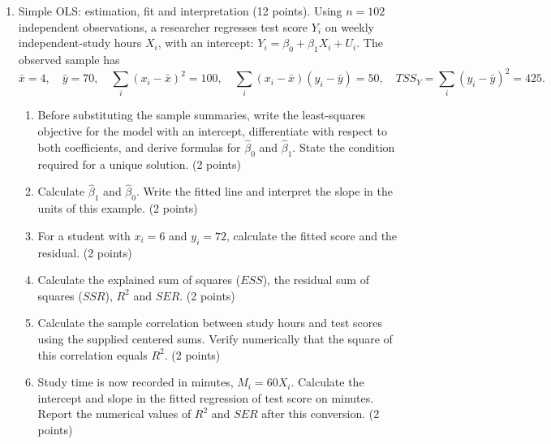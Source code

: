 \documentclass[a4paper,11pt,twoside]{article}
\begin{document}
\begin{enumerate}[label=\arabic*.,leftmargin=*,itemsep=5pt,topsep=4pt,parsep=0pt,start=9]
\item Simple OLS: estimation, fit and interpretation (12 points).
Using $n=102$ independent observations, a researcher regresses test score $Y_i$
on weekly independent-study hours $X_i$, with an intercept:
$Y_i=\beta_0+\beta_1X_i+U_i$. The observed sample has
\[
\bar x=4,\quad \bar y=70,\quad
\sum_i(x_i-\bar x)^2=100,\quad
\sum_i(x_i-\bar x)(y_i-\bar y)=50,\quad
TSS_Y=\sum_i(y_i-\bar y)^2=425.
\]
\begin{enumerate}[label=(\alph*),leftmargin=*,itemsep=2pt,topsep=2pt]
\item Before substituting the sample summaries, write the least-squares objective for the model with an intercept,
differentiate with respect to both coefficients, and derive formulas for
$\widehat\beta_0$ and $\widehat\beta_1$. State the condition required for a unique
solution. (2 points)
\item Calculate $\widehat\beta_1$ and $\widehat\beta_0$. Write the fitted line
and interpret the slope in the units of this example. (2 points)
\item For a student with $x_i=6$ and $y_i=72$, calculate the fitted score and
the residual. (2 points)
\item Calculate the explained sum of squares ($ESS$), the residual sum of
squares ($SSR$), $R^2$ and $SER$. (2 points)
\item Calculate the sample correlation between study hours and test scores
using the supplied centered sums. Verify numerically that the square of this correlation equals
$R^2$. (2 points)
\item Study time is now recorded in minutes, $M_i=60X_i$. Calculate the
intercept and slope in the fitted regression of test score on minutes.
Report the numerical values of $R^2$ and $SER$ after this conversion.
(2 points)
\end{enumerate}



\end{enumerate}
\end{document}
